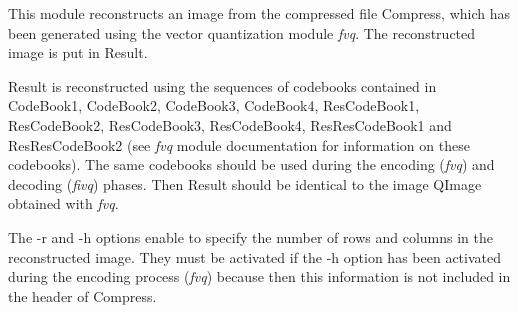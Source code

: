 This module reconstructs an image from the compressed file Compress, 
which has been generated using the vector quantization
module {\em fvq}. 
The reconstructed image is put in Result. 

Result is reconstructed using the sequences of codebooks contained 
in CodeBook1, CodeBook2, CodeBook3, CodeBook4, ResCodeBook1, 
ResCodeBook2, ResCodeBook3, ResCodeBook4, ResResCodeBook1 and ResResCodeBook2 
(see {\em fvq} module documentation for information on these codebooks). 
The same codebooks should be used during the encoding ({\em fvq}) and 
decoding ({\em fivq}) phases. Then Result should be identical 
to the image QImage obtained with {\em fvq}. 


The -r and -h options enable to specify the number of rows and columns 
in the reconstructed image. They must be activated if the -h option has 
been activated during the encoding process ({\em fvq}) because then this 
information is not included in the header of Compress. 
